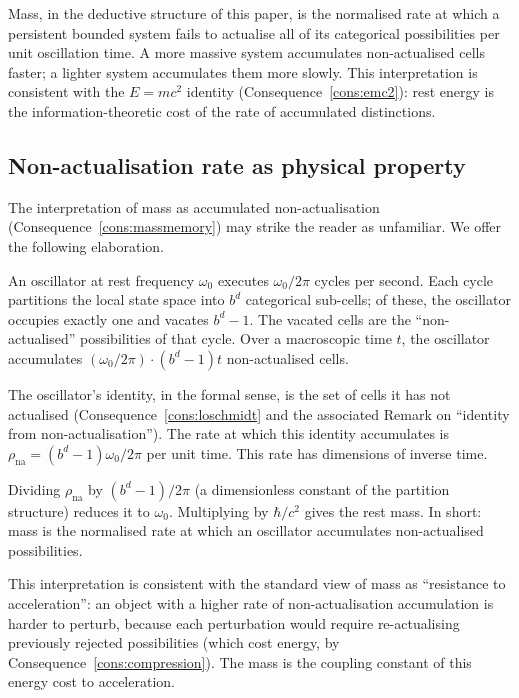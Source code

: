 \begin{interpretation}
Mass, in the deductive structure of this paper, is the normalised rate at which a persistent bounded system fails to actualise all of its categorical possibilities per unit oscillation time. A more massive system accumulates non-actualised cells faster; a lighter system accumulates them more slowly. This interpretation is consistent with the $E=mc^{2}$ identity (Consequence~\ref{cons:emc2}): rest energy is the information-theoretic cost of the rate of accumulated distinctions.
\end{interpretation}

\subsection{Non-actualisation rate as physical property}

The interpretation of mass as accumulated non-actualisation (Consequence~\ref{cons:massmemory}) may strike the reader as unfamiliar. We offer the following elaboration.

An oscillator at rest frequency $\omega_{0}$ executes $\omega_{0}/2\pi$ cycles per second. Each cycle partitions the local state space into $b^{d}$ categorical sub-cells; of these, the oscillator occupies exactly one and vacates $b^{d}-1$. The vacated cells are the ``non-actualised'' possibilities of that cycle. Over a macroscopic time $t$, the oscillator accumulates $(\omega_{0}/2\pi)\cdot(b^{d}-1)t$ non-actualised cells.

The oscillator's identity, in the formal sense, is the set of cells it has not actualised (Consequence~\ref{cons:loschmidt} and the associated Remark on ``identity from non-actualisation''). The rate at which this identity accumulates is $\rho_{\text{na}}=(b^{d}-1)\omega_{0}/2\pi$ per unit time. This rate has dimensions of inverse time.

Dividing $\rho_{\text{na}}$ by $(b^{d}-1)/2\pi$ (a dimensionless constant of the partition structure) reduces it to $\omega_{0}$. Multiplying by $\hbar/c^{2}$ gives the rest mass. In short: mass is the normalised rate at which an oscillator accumulates non-actualised possibilities.

This interpretation is consistent with the standard view of mass as ``resistance to acceleration'': an object with a higher rate of non-actualisation accumulation is harder to perturb, because each perturbation would require re-actualising previously rejected possibilities (which cost energy, by Consequence~\ref{cons:compression}). The mass is the coupling constant of this energy cost to acceleration.

